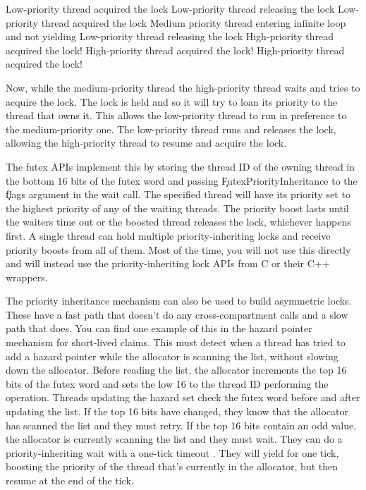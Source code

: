 \begin{console}
Low-priority thread acquired the lock
Low-priority thread releasing the lock
Low-priority thread acquired the lock
Medium priority thread entering infinite loop and not yielding
Low-priority thread releasing the lock
High-priority thread acquired the lock!
High-priority thread acquired the lock!
High-priority thread acquired the lock!
\end{console}

Now, while the medium-priority thread the high-priority thread waits and tries to acquire the lock.
The lock is held and so it will try to loan its priority to the thread that owns it.
This allows the low-priority thread to run in preference to the medium-priority one.
The low-priority thread runs and releases the lock, allowing the high-priority thread to resume and acquire the lock.

The futex APIs implement this by storing the thread ID of the owning thread in the bottom 16 bits of the futex word and passing \c{FutexPriorityInheritance} to the \c{flags} argument in the wait call.
The specified thread will have its priority set to the highest priority of any of the waiting threads.
The priority boost lasts until the waiters time out or the boosted thread releases the lock, whichever happens first.
A single thread can hold multiple priority-inheriting locks and receive priority boosts from all of them.
Most of the time, you will not use this directly and will instead use the priority-inheriting lock APIs from C or their C++ wrappers.

The priority inheritance mechanism can also be used to build asymmetric locks.
These have a fast path that doesn't do any cross-compartment calls and a slow path that does.
You can find one example of this in the hazard pointer mechanism for short-lived claims.
This must detect when a thread has tried to add a hazard pointer while the allocator is scanning the list, without slowing down the allocator.
Before reading the list, the allocator increments the top 16 bits of the futex word and sets the low 16 to the thread ID performing the operation.
Threads updating the hazard set check the futex word before and after updating the list.
If the top 16 bits have changed, they know that the allocator has scanned the list and they must retry.
If the top 16 bits contain an odd value, the allocator is currently scanning the list and they must wait.
They can do a priority-inheriting wait with a one-tick timeout .
They will yield for one tick, boosting the priority of the thread that's currently in the allocator, but then resume at the end of the tick.



